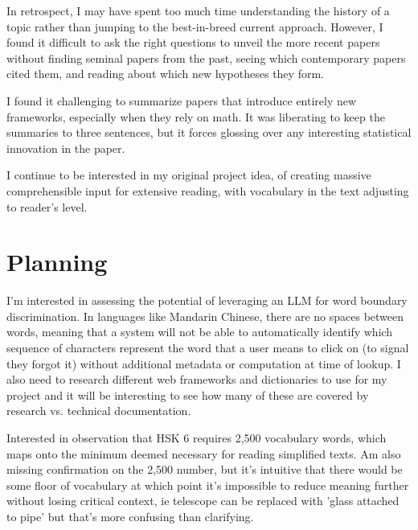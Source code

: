 \documentclass[
	letterpaper, %
]{jdf}
\begin{document}
In retrospect, I may have spent too much time understanding the history of a topic rather than jumping to the best-in-breed current approach. However, I found it difficult to ask the right questions to unveil the more recent papers without finding seminal papers from the past, seeing which contemporary papers cited them, and reading about which new hypotheses they form.

I found it challenging to summarize papers that introduce entirely new frameworks, especially when they rely on math. It was liberating to keep the summaries to three sentences, but it forces glossing over any interesting statistical innovation in the paper.

I continue to be interested in my original project idea, of creating massive comprehensible input for extensive reading, with vocabulary in the text adjusting to reader's level.

\section{Planning}

I'm interested in assessing the potential of leveraging an LLM for word boundary discrimination. In languages like Mandarin Chinese, there are no spaces between words, meaning that a system will not be able to automatically identify which sequence of characters represent the word that a user means to click on (to signal they forgot it) without additional metadata or computation at time of lookup. I also need to research different web frameworks and dictionaries to use for my project and it will be interesting to see how many of these are covered by research vs. technical documentation.

Interested in observation that HSK 6 requires 2,500 vocabulary words, which maps onto the minimum deemed necessary for reading simplified texts. Am also missing confirmation on the 2,500 number, but it's intuitive that there would be some floor of vocabulary at which point it's impossible to reduce meaning further without losing critical context, ie telescope can be replaced with 'glass attached to pipe' but that's more confusing than clarifying.


\printbibliography{}
\end{document}
